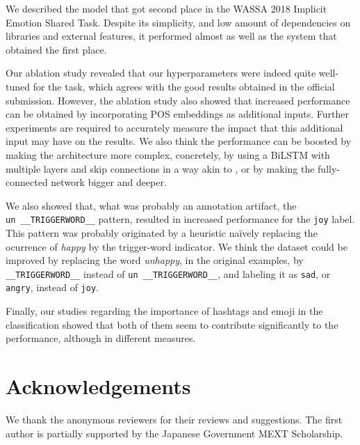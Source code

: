 \documentclass[11pt,a4paper]{article}
\begin{document}
We described the model that got second place in the WASSA 2018 Implicit Emotion
Shared Task. Despite its simplicity, and low amount of dependencies on libraries
and external features, it performed almost as well as the system that obtained
the first place.

Our ablation study revealed that our hyperparameters were indeed quite
well-tuned for the task, which agrees with the good results obtained in the
official submission. However, the ablation study also showed that increased
performance can be obtained by incorporating POS embeddings as additional
inputs. Further experiments are required to accurately measure the impact that
this additional input may have on the results. We also think the performance can
be boosted by making the architecture more complex, concretely, by using a
BiLSTM with multiple layers and skip connections in a way akin to
\cite{peters2018deep}, or by making the fully-connected network bigger and
deeper.

We also showed that, what was probably an annotation artifact, the
\texttt{un~\_\_TRIGGERWORD\_\_} pattern, resulted in increased performance for
the \texttt{joy} label. This pattern was probably originated by a heuristic
naïvely replacing the ocurrence of \textit{happy} by the trigger-word indicator.
We think the dataset could be improved by replacing the word \textit{unhappy},
in the original examples, by \texttt{\_\_TRIGGERWORD\_\_} instead of
\texttt{un~\_\_TRIGGERWORD\_\_}, and labeling it as \texttt{sad}, or
\texttt{angry}, instead of \texttt{joy}.


Finally, our studies regarding the importance of hashtags and emoji in the
classification showed that both of them seem to contribute significantly to the
performance, although in different measures. 

\section{Acknowledgements}%
\label{sec:acknowledgements}

We thank the anonymous reviewers for their reviews and suggestions. The first
author is partially supported by the Japanese Government MEXT Scholarship.



\end{document}

